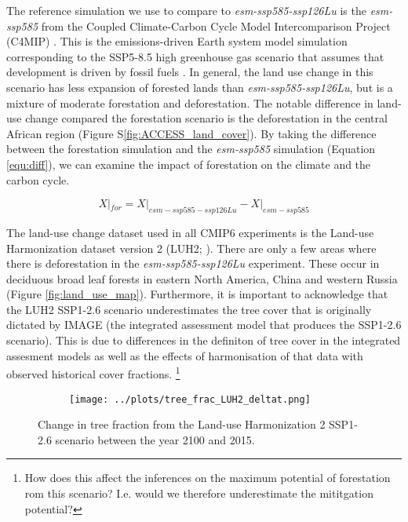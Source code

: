 \documentclass[]{article}
\begin{document}
The reference simulation we use to compare to \textit{esm-ssp585-ssp126Lu} is the \textit{esm-ssp585} from the Coupled Climate-Carbon Cycle Model Intercomparison Project (C4MIP) \parencite{jones_c4mip_2016}.
This is the emissions-driven Earth system model simulation corresponding to the SSP5-8.5 high greenhouse gas scenario that assumes that development is driven by fossil fuels \parencite{oneill_scenario_2016}.
In general, the land use change in this scenario has less expansion of forested lands than \textit{esm-ssp585-ssp126Lu}, but is a mixture of moderate forestation and deforestation.
The notable difference in land-use change compared the forestation scenario is the deforestation in the central African region (Figure S\ref{fig:ACCESS_land_cover}).
By taking the difference between the forestation simulation and the \textit{esm-ssp585} simulation (Equation \ref{equ:diff}), we can examine the impact of forestation on the climate and the carbon cycle.

\begin{equation}
    X|_{for} = X|_{esm-ssp585-ssp126Lu} - X|_{esm-ssp585}
    \label{equ:diff}
\end{equation}

The land-use change dataset used in all CMIP6 experiments is the Land-use Harmonization dataset version 2 (LUH2; \cite{hurtt_harmonization_2020}).
There are only a few areas where there is deforestation in the \textit{esm-ssp585-ssp126Lu} experiment.
These occur in deciduous broad leaf forests in eastern North America, China and western Russia (Figure \ref{fig:land_use_map}).
Furthermore, it is important to acknowledge that the LUH2 SSP1-2.6 scenario underestimates the tree cover that is originally dictated by IMAGE (the integrated assessment model that produces the SSP1-2.6 scenario).
This is due to differences in the definiton of tree cover in the integrated assesment models as well as the effects of harmonisation of that data with observed historical cover fractions. \footnote{How does this affect the inferences on the maximum potential of forestation rom this scenario? I.e. would we therefore underestimate the mititgation potential?}

\begin{figure}[H]
    \centering
    \begin{subfigure}[b]{\linewidth}
        \texttt{[image: ../plots/tree\_frac\_LUH2\_deltat.png]}
    \end{subfigure}
    \caption{Change in tree fraction from the Land-use Harmonization 2 SSP1-2.6 scenario between the year 2100 and 2015.}
    \label{fig:land_use}
\end{figure}
\end{document}
